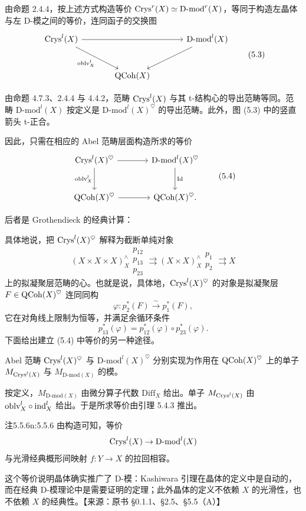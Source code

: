 由命题 2.4.4，按上述方式构造等价 $\mathrm{Crys}^r(X)\simeq\mathrm{D\text{-}mod}^r(X)$，等同于构造左晶体与左 D-模之间的等价，连同函子的交换图
\begin{equation}
\begin{tikzcd}[column sep=large, row sep=large]
 \Crys^l(X) \arrow[rr] \arrow[dr, "\oblv^l_X"'] & & \mathrm{D\text{-}mod}^l(X) \arrow[dl] \\
 & \QCoh(X) &
\end{tikzcd}\tag{5.3}
\end{equation}

由命题 4.7.3、2.4.4 与 4.4.2，范畴 $\mathrm{Crys}^l(X)$ 与其 t-结构心的导出范畴等同。范畴 $\mathrm{D\text{-}mod}^l(X)$ 按定义是 $\mathrm{D\text{-}mod}^l(X)^{\heartsuit}$ 的导出范畴。此外，图 (5.3) 中的竖直箭头 t-正合。

因此，只需在相应的 Abel 范畴层面构造所求的等价
\begin{equation}
\begin{tikzcd}[column sep=large, row sep=large]
 \Crys^l(X)^{\heartsuit} \arrow[r] \arrow[d, "\oblv^l_X"'] & \mathrm{D\text{-}mod}^l(X)^{\heartsuit} \arrow[d, "\mathrm{Id}"] \\
 \QCoh(X)^{\heartsuit} \arrow[r] & \QCoh(X)^{\heartsuit}.
\end{tikzcd}\tag{5.4}
\end{equation}

后者是 Grothendieck 的经典计算：

具体地说，把 $\mathrm{Crys}^l(X)^{\heartsuit}$ 解释为截断单纯对象
\[
(X\times X\times X)^{\wedge}_X\substack{p_{12}\\[-2pt]p_{13}\\[-2pt]p_{23}}\rightrightarrows(X\times X)^{\wedge}_X\substack{p_1\\[-2pt]p_2}\rightrightarrows X
\]
上的拟凝聚层范畴的心。也就是说，具体地，$\mathrm{Crys}^l(X)^{\heartsuit}$ 的对象是拟凝聚层 $F\in\mathrm{QCoh}(X)^{\heartsuit}$ 连同同构
\[
\varphi:p_2^*(F)\xrightarrow{\sim}p_1^*(F),
\]
它在对角线上限制为恒等，并满足余循环条件
\[
p_{13}^*(\varphi)=p_{12}^*(\varphi)\circ p_{23}^*(\varphi).
\]
下面给出建立 (5.4) 中等价的另一种途径。

Abel 范畴 $\mathrm{Crys}^l(X)^{\heartsuit}$ 与 $\mathrm{D\text{-}mod}^l(X)^{\heartsuit}$ 分别实现为作用在 $\mathrm{QCoh}(X)^{\heartsuit}$ 上的单子 $M_{\mathrm{Crys}^l(X)}$ 与 $M_{\mathrm{D\text{-}mod}(X)}$ 的模。

按定义，$M_{\mathrm{D\text{-}mod}(X)}$ 由微分算子代数 $\mathrm{Diff}_X$ 给出。单子 $M_{\mathrm{Crys}^l(X)}$ 由 $\mathrm{oblv}^l_X\circ\mathrm{ind}^l_X$ 给出。于是所求等价由引理 5.4.3 推出。

\begin{othm}{注}{5.5.6}{n:5.5.6}
由构造可知，等价
\[
\mathrm{Crys}^l(X)\to\mathrm{D\text{-}mod}^l(X)
\]
与光滑经典概形间映射 $f:Y\to X$ 的拉回相容。
\end{othm}

\begin{annote}
这个等价说明晶体确实推广了 D-模：Kashiwara 引理在晶体的定义中是自动的，而在经典 D-模理论中是需要证明的定理；此外晶体的定义不依赖 $X$ 的光滑性，也不依赖 $X$ 的经典性。\hfill【来源：原书 §0.1.1、§2.5、§5.5（A）】
\end{annote}


